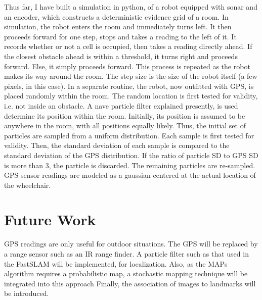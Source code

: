 \documentclass{article}
\begin{document}
Thus far, I have built a simulation in python, of a robot equipped with sonar and an encoder, which constructs a deterministic evidence grid of a room.  In simulation, the robot enters the room and immediately turns left.  It then proceeds forward for one step, stops and takes a reading to the left of it.  It records whether or not a cell is occupied, then takes a reading directly ahead.  If the closest obstacle ahead is within a threshold, it turns right and proceeds forward.  Else,  it simply proceeds forward.  This process is repeated as the robot makes its way around the room.  The step size is the size of the robot itself (a few pixels, in this case).
In a separate routine, the robot, now outfitted with GPS, is placed randomly within the room.  The random location is first tested for validity, i.e. not inside an obstacle.  A nave particle filter explained presently, is used determine its position within the room.  Initially, its position is assumed to be anywhere in the room, with all positions equally likely.  Thus, the initial set of particles are sampled from a uniform distribution.  Each sample is first tested for validity.  Then, the standard deviation of each sample is compared to the standard deviation of the GPS distribution.  If the ratio of particle SD to GPS SD is more than 3, the particle is discarded.  The remaining particles are re-sampled.  GPS sensor readings are modeled as a gaussian centered at the actual location of the wheelchair.  

\section{Future Work}

GPS readings are only useful for outdoor situations.  The GPS will be replaced by a range sensor such as an IR range finder.  A particle filter such as that used in the FastSLAM \cite{montemerlo_fastslam_2003} will be implemented, for localization.  Also, as the MAPs algorithm requires a probabilistic map, a stochastic mapping technique will be integrated into this approach  Finally, the association of images to landmarks will be introduced.



\end{document}
